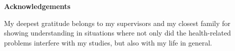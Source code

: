 \thispagestyle{empty}

\mbox{}
\vfill

\large
\noindent \textbf{Acknowledgements}
\normalsize

\noindent My deepest gratitude belongs to my supervisors and my closest family for showing understanding in situations where not only did the health-related problems interfere with my studies, but also with my life in general.
